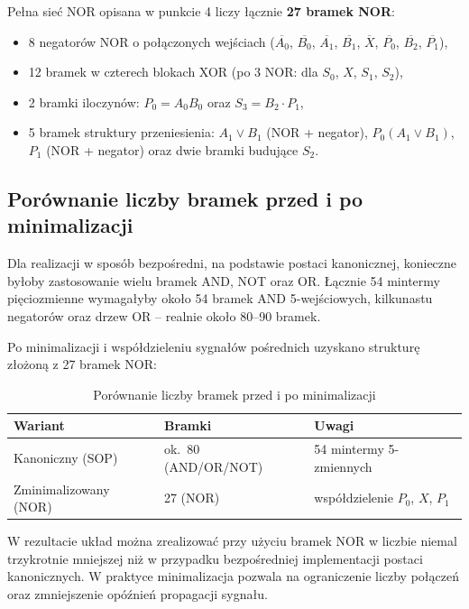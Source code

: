 \documentclass[11pt]{article}
\begin{document}
Pełna sieć NOR opisana w punkcie 4 liczy łącznie \textbf{27 bramek NOR}:
\begin{itemize}
    \item 8 negatorów NOR o połączonych wejściach (\(\overline{A_0}\), \(\overline{B_0}\), \(\overline{A_1}\), \(\overline{B_1}\), \(\overline{X}\), \(\overline{P_0}\), \(\overline{B_2}\), \(\overline{P_1}\)),
    \item 12 bramek w czterech blokach XOR (po 3 NOR: dla \(S_0\), \(X\), \(S_1\), \(S_2\)),
    \item 2 bramki iloczynów: \(P_0 = A_0 B_0\) oraz \(S_3 = B_2 \cdot P_1\),
    \item 5 bramek struktury przeniesienia: \(A_1 \lor B_1\) (NOR + negator), \(P_0(A_1 \lor B_1)\), \(P_1\) (NOR + negator) oraz dwie bramki budujące \(S_2\).
\end{itemize}

\subsection{Porównanie liczby bramek przed i po minimalizacji}

Dla realizacji w sposób bezpośredni, na podstawie postaci kanonicznej, konieczne byłoby zastosowanie wielu bramek AND, NOT oraz OR. Łącznie 54 mintermy pięciozmienne wymagałyby około 54 bramek AND 5-wejściowych, kilkunastu negatorów oraz drzew OR -- realnie około 80--90 bramek.

Po minimalizacji i współdzieleniu sygnałów pośrednich uzyskano strukturę złożoną z 27 bramek NOR:
\begin{table}[H]
\centering
\caption{Porównanie liczby bramek przed i po minimalizacji}
\setlength{\tabcolsep}{5pt}
\begin{tabular}{lll}
\toprule
Wariant & Bramki & Uwagi \\
\midrule
Kanoniczny (SOP) & ok.~80 (AND/OR/NOT) & 54 mintermy 5-zmiennych \\
Zminimalizowany (NOR) & 27 (NOR) & wspó\l{}dzielenie \(P_0\), \(X\), \(P_1\) \\
\bottomrule
\end{tabular}
\end{table}

W rezultacie układ można zrealizować przy użyciu bramek NOR w liczbie niemal trzykrotnie mniejszej niż w przypadku bezpośredniej implementacji postaci kanonicznych. W praktyce minimalizacja pozwala na ograniczenie liczby połączeń oraz zmniejszenie opóźnień propagacji sygnału.
\end{document}
